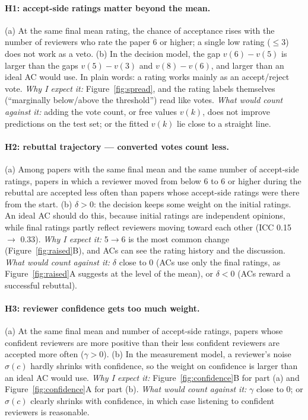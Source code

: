 \documentclass[11pt]{article}
\begin{document}
\paragraph{H1: accept-side ratings matter beyond the mean.}
(a) At the same final mean rating, the chance of acceptance rises with the number of reviewers who rate the paper 6 or higher; a single low rating ($\le 3$) does not work as a veto.
(b) In the decision model, the gap $v(6)-v(5)$ is larger than the gaps $v(5)-v(3)$ and $v(8)-v(6)$, and larger than an ideal AC would use. In plain words: a rating works mainly as an accept/reject vote.
\emph{Why I expect it:} Figure~\ref{fig:spread}, and the rating labels themselves (``marginally below/above the threshold'') read like votes.
\emph{What would count against it:} adding the vote count, or free values $v(k)$, does not improve predictions on the test set; or the fitted $v(k)$ lie close to a straight line.

\paragraph{H2: rebuttal trajectory --- converted votes count less.}
(a) Among papers with the same final mean and the same number of accept-side ratings, papers in which a reviewer moved from below 6 to 6 or higher during the rebuttal are accepted less often than papers whose accept-side ratings were there from the start.
(b) $\delta>0$: the decision keeps some weight on the initial ratings. An ideal AC should do this, because initial ratings are independent opinions, while final ratings partly reflect reviewers moving toward each other (ICC 0.15 $\to$ 0.33).
\emph{Why I expect it:} 5$\to$6 is the most common change (Figure~\ref{fig:raised}B), and ACs can see the rating history and the discussion.
\emph{What would count against it:} $\delta$ close to 0 (ACs use only the final ratings, as Figure~\ref{fig:raised}A suggests at the level of the mean), or $\delta<0$ (ACs reward a successful rebuttal).

\paragraph{H3: reviewer confidence gets too much weight.}
(a) At the same final mean and number of accept-side ratings, papers whose confident reviewers are more positive than their less confident reviewers are accepted more often ($\gamma>0$).
(b) In the measurement model, a reviewer's noise $\sigma(c)$ hardly shrinks with confidence, so the weight on confidence is larger than an ideal AC would use.
\emph{Why I expect it:} Figure~\ref{fig:confidence}B for part (a) and Figure~\ref{fig:confidence}A for part (b).
\emph{What would count against it:} $\gamma$ close to 0; or $\sigma(c)$ clearly shrinks with confidence, in which case listening to confident reviewers is reasonable.
\end{document}
